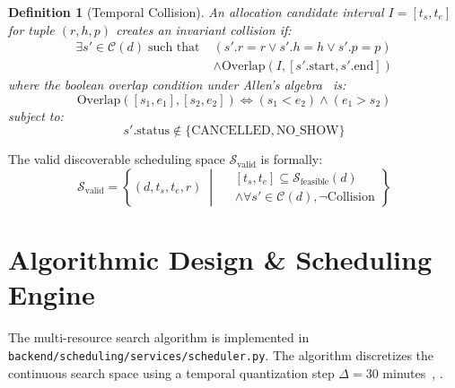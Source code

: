 \documentclass[conference]{IEEEtran}
\newtheorem{definition}{Definition}
\begin{document}
\begin{definition}[Temporal Collision]
An allocation candidate interval $I = [t_s, t_e]$ for tuple $(r, h, p)$ creates an invariant collision if:
\begin{equation}
\begin{aligned}
\exists s' \in \mathcal{C}(d) \;\text{such that}\; &\left( s'.r = r \lor s'.h = h \lor s'.p = p \right) \\
&\land \text{Overlap}(I, [s'.\text{start}, s'.\text{end}])
\end{aligned}
\end{equation}
where the boolean overlap condition under Allen's algebra~\cite{allen1983maintaining} is:
\begin{equation}
\text{Overlap}([s_1, e_1], [s_2, e_2]) \iff (s_1 < e_2) \land (e_1 > s_2)
\end{equation}
subject to:
\begin{equation}
s'.\text{status} \notin \{\text{CANCELLED}, \text{NO\_SHOW}\}
\end{equation}
\end{definition}

The valid discoverable scheduling space $\mathcal{S}_{\text{valid}}$ is formally:
\begin{equation}
\mathcal{S}_{\text{valid}} = \left\{ (d, t_s, t_e, r) \;\middle|\; 
\begin{aligned}
&[t_s, t_e] \subseteq \mathcal{S}_{\text{feasible}}(d) \\
&\land \forall s' \in \mathcal{C}(d), \neg \text{Collision}
\end{aligned}
\right\}
\end{equation}

\section{Algorithmic Design \& Scheduling Engine}

The multi-resource search algorithm is implemented in \texttt{backend/scheduling/services/scheduler.py}. The algorithm discretizes the continuous search space using a temporal quantization step $\Delta = 30$ minutes~\cite{cayirli2003outpatient}, \cite{allen1983maintaining}.
\end{document}
